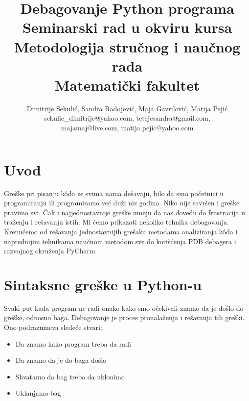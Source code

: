 \documentclass[a4paper]{article}
\begin{document}
\title{Debagovanje Python programa\\ \small{Seminarski rad u okviru kursa\\Metodologija stručnog i naučnog rada\\ Matematički fakultet}}

\author{Dimitrije Sekulić, Sandra Radojević, Maja Gavrilović, Matija Pejić\\ sekulic\_dimitrije@yahoo.com, tetejesandra@gmail.com,\\ majamaj@live.com, matija.pejic@yahoo.com}


\maketitle


\setcounter{tocdepth}{1}
\tableofcontents

\newpage

\section{Uvod}
\label{sec:uvod}

Greške pri pisanju k\^{o}da se svima nama dešavaju, bilo da smo početnici u programiranju ili programiramo već duži niz godina. Niko nije savršen i greške pravimo svi. Čak i najjednostavnije greške umeju da nas dovedu do frustracija u traženju i rešavanju istih. Mi ćemo prikazati nekoliko tehnika debagovanja. Krenućemo od rešavanja jednostavnijih grešaka metodama analiziranja k\^{o}da i naprednijim tehnikama naučnom metodom sve do korišćenja PDB debagera i razvojnog okruženja PyCharm.

\section{Sintaksne greške u Python-u}
Svaki put kada program ne radi onako kako smo očekivali znamo da je došlo do greške, odnosno baga. Debagovanje je proces pronalaženja i rešavanja tih greški. Ono podrazumeva sledeće stvari:
\begin{itemize}
\item Da znamo kako program treba da radi
\item Da znamo da je do baga došlo
\item Shvatamo da bag treba da uklonimo
\item Uklanjamo bag
\end{itemize}
\end{document}
